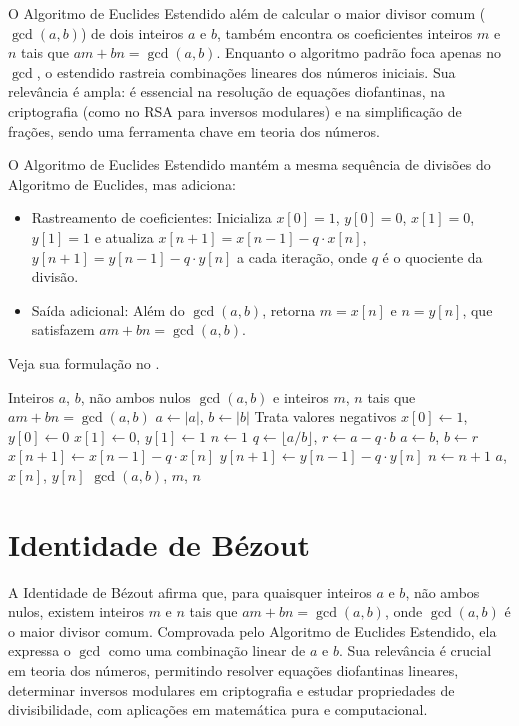 O Algoritmo de Euclides Estendido além de calcular o maior divisor comum
($\gcd(a, b)$) de dois inteiros $a$ e $b$,
também encontra os coeficientes inteiros $m$ e $n$ tais que $am + bn = \gcd(a, b)$.
Enquanto o algoritmo padrão foca apenas no $\gcd$, o estendido rastreia
combinações lineares dos números iniciais. Sua relevância é ampla: é essencial
na resolução de equações diofantinas, na criptografia (como no RSA para
inversos modulares) e na simplificação de frações, sendo uma ferramenta chave
em teoria dos números.

O Algoritmo de Euclides Estendido mantém a mesma sequência de divisões do
Algoritmo de Euclides, mas adiciona:
\begin{itemize}[noitemsep]
    \item Rastreamento de coeficientes: Inicializa $x[0] = 1$, $y[0] = 0$,
      $x[1] = 0$, $y[1] = 1$ e atualiza $x[n+1] = x[n-1] - q \cdot x[n]$,
      $y[n+1] = y[n-1] - q \cdot y[n]$ a cada iteração, onde $q$ é o quociente
      da divisão.
    \item Saída adicional: Além do $\gcd(a, b)$, retorna $m = x[n]$ e $n =
      y[n]$, que satisfazem $am + bn = \gcd(a, b)$.
\end{itemize}
Veja sua formulação no .

\begin{algorithm}
\caption{Algoritmo de Euclides Estendido}\label{alg:euclides}
\begin{algorithmic}[1]
\Require Inteiros $a$, $b$, não ambos nulos
\Ensure $\gcd(a, b)$ e inteiros $m$, $n$ tais que $am + bn = \gcd(a, b)$
\State $a \gets |a|$, $b \gets |b|$ \Comment Trata valores negativos
\State $x[0] \gets 1$, $y[0] \gets 0$
\State $x[1] \gets 0$, $y[1] \gets 1$
\State $n \gets 1$
    \State $q \gets \lfloor a / b \rfloor$, $r \gets a - q \cdot b$
    \State $a \gets b$, $b \gets r$
    \State $x[n+1] \gets x[n-1] - q \cdot x[n]$
    \State $y[n+1] \gets y[n-1] - q \cdot y[n]$
    \State $n \gets n + 1$
\EndWhile
\Return $a$, $x[n]$, $y[n]$ \Comment $\gcd(a, b)$, $m$, $n$
\end{algorithmic}
\end{algorithm}





\section{Identidade de Bézout}

A Identidade de Bézout afirma que, para quaisquer inteiros $a$ e $b$, não
ambos nulos, existem inteiros $m$ e $n$ tais que $am + bn = \gcd(a, b)$,
onde $\gcd(a, b)$ é o maior divisor comum. Comprovada pelo Algoritmo de
Euclides Estendido, ela expressa o $\gcd$ como uma combinação linear de $a$
e $b$. Sua relevância é crucial em teoria dos números, permitindo resolver
equações diofantinas lineares, determinar inversos modulares em criptografia e
estudar propriedades de divisibilidade, com aplicações em matemática pura e
computacional.


